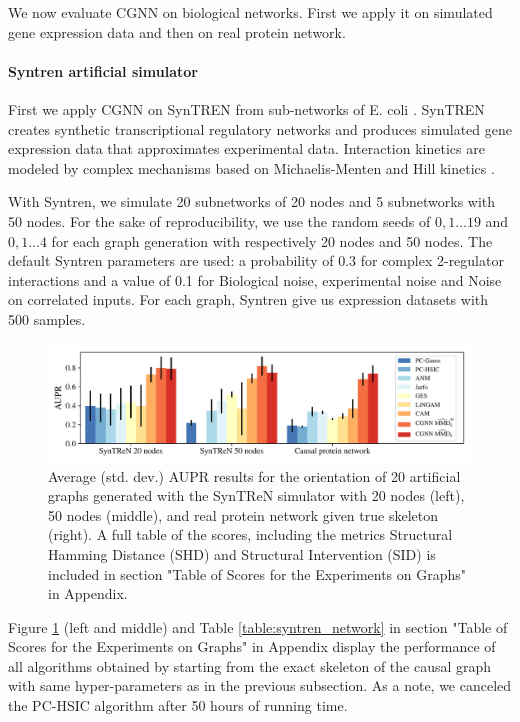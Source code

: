 \documentclass[a4paper, 11pt]{article}
\begin{document}
We now evaluate CGNN on biological networks. First we apply it on simulated gene expression data and then on real protein network.



\paragraph{Syntren artificial simulator}

 First we apply CGNN on SynTREN \citep{van2006syntren} from sub-networks of E. coli \citep{shen2002network}.
 SynTREN creates synthetic transcriptional regulatory networks and produces simulated gene expression data that approximates experimental data. Interaction kinetics are modeled by complex mechanisms based on Michaelis-Menten and Hill kinetics \citep{mendes2003artificial}.
 
With Syntren, we simulate 20 subnetworks of 20 nodes and 5 subnetworks with 50 nodes. For the sake of reproducibility, we use the random seeds  of $0,1 \ldots 19$ and $0,1 \ldots 4$ for each graph generation with respectively 20 nodes and 50 nodes.  The default Syntren parameters are used: a probability of 0.3 for complex 2-regulator interactions and a value of 0.1 for Biological noise, experimental noise and Noise on correlated inputs. For each graph, Syntren give us expression datasets with 500 samples. 

\begin{figure}[h!]
\centering
\includegraphics[width=\textwidth]{graph_scores_bio.pdf}
\caption{Average (std. dev.) AUPR results for the orientation of 20 artificial graphs generated with the SynTReN simulator with 20 nodes (left), 50 nodes (middle), and real protein network given true skeleton (right). A full table of the scores, including the metrics Structural Hamming Distance (SHD) and Structural Intervention (SID) \citep{peters2013structural} is included in section "Table of Scores for the Experiments on Graphs" in Appendix.}
\label{fig:score_bio}
\end{figure}

Figure \ref{fig:score_bio} (left and middle) and Table \ref{table:syntren_network} in section "Table of Scores for the Experiments on Graphs" in Appendix display the performance of all algorithms obtained by starting from the exact skeleton of the causal graph with same hyper-parameters as in the previous subsection. As a note, we canceled the PC-HSIC algorithm after 50 hours of running time.
\end{document}
